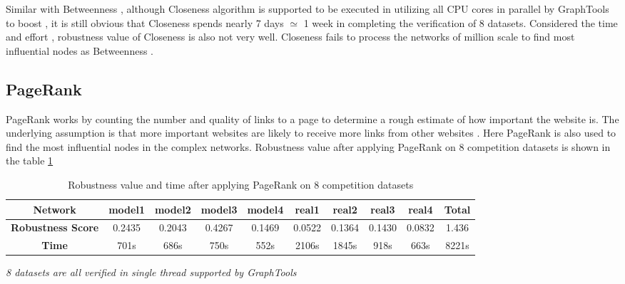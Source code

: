 \documentclass{article}
\begin{document}
	Similar with Betweenness , although Closeness algorithm is supported to be executed in utilizing all CPU cores in parallel by GraphTools to boost , it is still obvious that Closeness spends nearly 7 days $\simeq$ 1 week in completing the verification of 8 datasets. Considered the time and effort , robustness value of Closeness is also not very well. Closeness fails to process the networks of million scale to find most influential nodes as Betweenness .
	
	
	\subsection{PageRank}	
	
	
	PageRank works by counting the number and quality of links to a page to determine a rough estimate of how important the website is. The underlying assumption is that more important websites are likely to receive more links from other websites \cite{wikiPageRank}\cite{page1999pagerank}. Here PageRank is also used to find the most influential nodes in the complex networks. Robustness value after applying PageRank on 8 competition datasets is shown in the table \ref{tab:table4}
	
	\begin{table}[]
	\begin{adjustwidth}{-1.3cm}{}		
		\begin{threeparttable}
			\centering
			\caption{Robustness value and time after applying PageRank on 8 competition datasets}
			\label{tab:table4}
			
			\begin{tabular}{|c|c|c|c|c|c|c|c|c|c|}
				\hline
				\textbf{Network}          & \textbf{model1} & \textbf{model2} & \textbf{model3} & \textbf{model4} & \textbf{real1} & \textbf{real2} & \textbf{real3} & \textbf{real4} & \textbf{Total} \\ \hline
				\textbf{Robustness Score} & 0.2435          & 0.2043          & 0.4267          & 0.1469          & 0.0522         & 0.1364         & 0.1430         & 0.0832         & 1.436          \\ \hline
				\textbf{Time}     & 701s             & 686s             & 750s             & 552s             & 2106s           & 1845s           & 918s            & 663s            & 8221s           \\ \hline							
			\end{tabular}
			\begin{tablenotes}
				\small
				\item\textit{8 datasets are all verified in single thread supported by GraphTools \cite{peixotographtool2014} }
			\end{tablenotes}			
		\end{threeparttable}
	\end{adjustwidth}
	\end{table}
\end{document}
